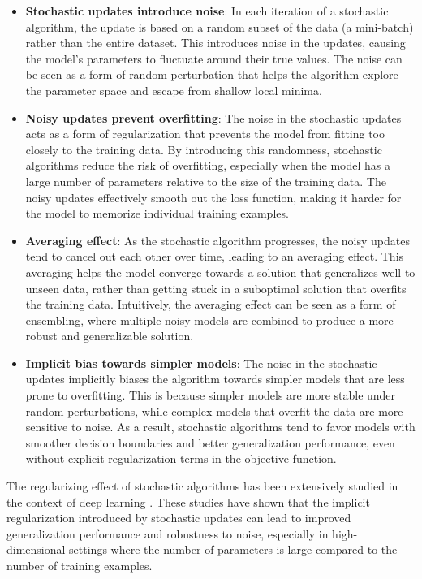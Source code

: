 \begin{itemize}
    \item \textbf{Stochastic updates introduce noise}: In each iteration of a stochastic algorithm, the update is based on a random subset of the data (a mini-batch) rather than the entire dataset. This introduces noise in the updates, causing the model's parameters to fluctuate around their true values. The noise can be seen as a form of random perturbation that helps the algorithm explore the parameter space and escape from shallow local minima.
    \item \textbf{Noisy updates prevent overfitting}: The noise in the stochastic updates acts as a form of regularization that prevents the model from fitting too closely to the training data. By introducing this randomness, stochastic algorithms reduce the risk of overfitting, especially when the model has a large number of parameters relative to the size of the training data. The noisy updates effectively smooth out the loss function, making it harder for the model to memorize individual training examples.

    \item \textbf{Averaging effect}: As the stochastic algorithm progresses, the noisy updates tend to cancel out each other over time, leading to an averaging effect. This averaging helps the model converge towards a solution that generalizes well to unseen data, rather than getting stuck in a suboptimal solution that overfits the training data. Intuitively, the averaging effect can be seen as a form of ensembling, where multiple noisy models are combined to produce a more robust and generalizable solution.
    
    \item \textbf{Implicit bias towards simpler models}: The noise in the stochastic updates implicitly biases the algorithm towards simpler models that are less prone to overfitting. This is because simpler models are more stable under random perturbations, while complex models that overfit the data are more sensitive to noise. As a result, stochastic algorithms tend to favor models with smoother decision boundaries and better generalization performance, even without explicit regularization terms in the objective function.
\end{itemize}

The regularizing effect of stochastic algorithms has been extensively studied in the context of deep learning \citep{zhang2021understanding,chaudhari2018stochastic}. These studies have shown that the implicit regularization introduced by stochastic updates can lead to improved generalization performance and robustness to noise, especially in high-dimensional settings where the number of parameters is large compared to the number of training examples.

